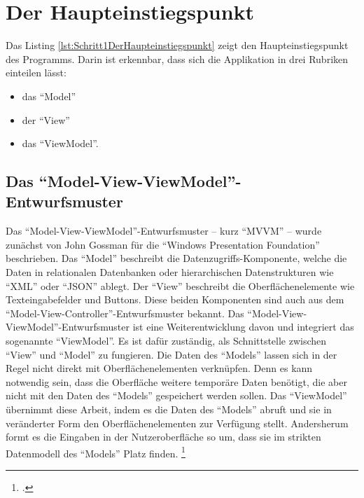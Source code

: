 \ifodd\value{page}\hbox{}\newpage\fi

\section{Der Haupteinstiegspunkt}
\label{sec:Haupteinstiegspunkt}

Das Listing \ref{lst:Schritt1DerHaupteinstiegspunkt} zeigt den Haupteinstiegspunkt des Programms.
Darin ist erkennbar, dass sich die Applikation in drei Rubriken einteilen lässt:
\begin{itemize}
  \item das \enquote{Model} 
  \item der \enquote{View} 
  \item das \enquote{ViewModel}. 
\end{itemize}



\subsection{Das \enquote{Model-View-ViewModel}-Entwurfsmuster}
\label{sec:ModelViewViewModel}
Das \enquote{Model-View-ViewModel}-Entwurfsmuster -- kurz \enquote{MVVM} -- wurde zunächst von John Gossman für die \enquote{Windows Presentation Foundation} beschrieben.
Das \enquote{Model} beschreibt die Datenzugriffs-Komponente, welche die Daten in relationalen Datenbanken oder hierarchischen Datenstrukturen wie \enquote{XML} oder \enquote{JSON} ablegt.
Der \enquote{View} beschreibt die Oberflächenelemente wie Texteingabefelder und Buttons.
Diese beiden Komponenten sind auch aus dem \enquote{Model-View-Controller}-Entwurfsmuster bekannt.
Das \enquote{Model-View-ViewModel}-Entwurfsmuster ist eine Weiterentwicklung davon und integriert das sogenannte \enquote{ViewModel}.
Es ist dafür zuständig, als Schnittstelle zwischen \enquote{View} und \enquote{Model} zu fungieren.
Die Daten des \enquote{Models} lassen sich in der Regel nicht direkt mit Oberflächenelementen verknüpfen.
Denn es kann notwendig sein, dass die Oberfläche weitere temporäre Daten benötigt, die aber nicht mit den Daten des \enquote{Models} gespeichert werden sollen.
Das \enquote{ViewModel} übernimmt diese Arbeit, indem es die Daten des \enquote{Models} abruft und sie in veränderter Form den Oberflächenelementen zur Verfügung stellt.
Andersherum formt es die Eingaben in der Nutzeroberfläche so um, dass sie im strikten Datenmodell des \enquote{Models} Platz finden.
\footcite[Vgl.][]{IntroductionToModelViewViewModelPatternForBuildingWPFApps}

